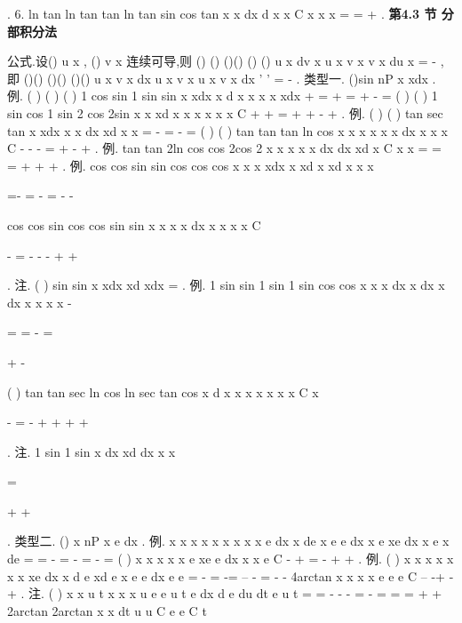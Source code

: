 \int 
\int 
. 
6.
ln tan
ln tan
tan
ln tan
sin cos
tan
x
x
dx
d
x
x
C
x
x
x
=
=
+
\int 
\int 
. 
\vspace{6pt}
{\large \bfseries \textcolor{lyred}{第4.3 节 分部积分法}}

\textcolor{lyred}{公式}.设()
u x , ()
v x 连续可导,则
()
()
()()
()
()
u x dv x
u x v x
v x du x
=
-
\int 
\int 
,即 
()()
()()
()()
u x v x dx
u x v x
u
x v x dx
'
'
=
-
\int 
\int 
. 
\textcolor{lyred}{类型一}.
()sin
nP
x
xdx
\int 
. 
\textcolor{lyred}{例}. (
)
(
)
(
)
1 cos
sin
1 sin
sin
x
xdx
x
d
x
x
x
x
xdx
+
=
+
=
+
-
=
\int 
\int 
\int 
(
)
(
)
1 sin
cos
1 sin
2 cos
2sin
x
x
xd
x
x
x
x
x
x
C
+
+
=
+
+
-
+
\int 
. 
\textcolor{lyred}{例}.
(
)
(
)
tan
sec
tan
x
xdx
x
x
dx
xd
x
x
=
-
=
-
=
\int 
\int 
\int 
(
)
(
)
tan
tan
tan
ln cos
x
x
x
x
x
x dx
x
x
x
C
-
-
-
=
+
-
+
\int 
. 
\textcolor{lyred}{例}.
tan
tan
2ln cos
cos
2cos 2
x
x
x
x
x
dx
dx
xd
x
C
x
x
=
=
=
+
+
+
\int 
\int 
\int 
. 
\textcolor{lyred}{例}.
cos
cos
sin
sin
cos
cos
cos
x
x
x
xdx
x
xd
x
xd
x
x
x




=-
=
-
=
-
-








\int 
\int 
\int 
cos
cos
sin
cos
cos
sin
sin
x
x
x
x dx
x
x
x
x
C






-
=
-
-
-
+
+












\int 
. 
\textcolor{lyred}{注}.
(
)
sin
sin
x
xdx
xd
xdx
=
\int 
\int 
\int 
. 
\textcolor{lyred}{例}.
1 sin
sin
1 sin
1 sin
cos
cos
x
x
x
dx
x
dx
x
dx
x
x
x
x
-


=
\cdots 
=
-
=


+
-


\int 
\int 
\int 
(
)
tan
tan
sec
ln cos
ln sec
tan
cos
x d
x
x
x
x
x
x
x
C
x


\cdots 
-
=
-
+
+
+
+




\int 
. 
\textcolor{lyred}{注}.
1 sin
1 sin
x
dx
xd
dx
x
x


=


+
+


\int 
\int 
\int 
. 
\textcolor{lyred}{类型二}.
()
x
nP x e dx
\int 
. 
\textcolor{lyred}{例}.
x
x
x
x
x
x
x
x
x e dx
x de
x e
e dx
x e
xe dx
x e
x de
=
=
-
=
-
=
-
\cdots 
=
\int 
\int 
\int 
\int 
\int 
(
)
x
x
x
x
x e
xe
e dx
x
x
e
C
-
+
=
-
+
+
\int 
. 
\textcolor{lyred}{例}.
(
)
x
x
x
x
x
x
x
xe dx
x
d e
xd e
x e
e
dx
e
e
=
-
=
-=
--
-
=
-
-
\int 
\int 
\int 
\int 
4arctan
x
x
x
x e
e
e
C
--
-+
-+
. 
\textcolor{lyred}{注}.
(
)
x
x
u t
x
x
x
u e
e
u
t
e
dx
d e
du
dt
e
u
t
=
=
-
-
-
=
-
=
=
=
+
+
\int 
\int 
\int 
\int 
2arctan
2arctan
x
x
dt
u
u
C
e
e
C
t


